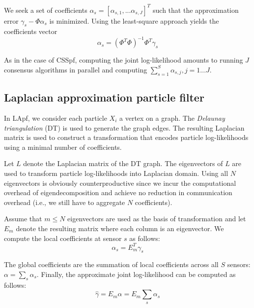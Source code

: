 \documentclass[10pt,letterpaper,final]{article}
\begin{document}
We seek a set of coefficients $\alpha_s = [\alpha_{s,1},...\alpha_{s,J}]^T$ such that the approximation error $\gamma_s - \Phi \alpha_s$ is minimized. Using the least-square approach yields the coefficients vector
\begin{equation}
\alpha_s = (\Phi^T\Phi)^{-1}\Phi^T\gamma_s
\end{equation}

As in the case of CSSpf, computing the joint log-likelihood amounts to running $J$ consensus algorithms in parallel and computing $\sum_{s=1}^S \alpha_{s,j}, j=1...J$.


\subsection{Laplacian approximation particle filter}
In LApf, we consider each particle $X_i$ a vertex on a graph. The \textit{Delaunay triangulation} (DT) is used to generate the graph edges. The resulting Laplacian matrix is used to construct a transformation that encodes particle log-likelihoods using a minimal number of coefficients. 

Let $L$ denote the Laplacian matrix of the DT graph. The eigenvectors of $L$ are used to transform particle log-likelihoods into Laplacian domain. Using all $N$ eigenvectors is obviously counterproductive since we incur the computational overhead of eigendecomposition and achieve no reduction in communication overhead (i.e., we still have to aggregate $N$ coefficients). 

Assume that $m\leq N$ eigenvectors are used as the basis of transformation and let $E_m$ denote the resulting matrix where each column is an eigenvector. We compute the local coefficients at sensor $s$ as follows:
\begin{equation}
\alpha_s = E_m^T\gamma_s
\end{equation}

The global coefficients are the summation of local coefficients across all $S$ sensors: $\alpha = \sum_s \alpha_s$. Finally, the approximate joint log-likelihood can be computed as follows:
\begin{equation}
\hat{\gamma} = E_m\alpha = E_m \sum_s \alpha_s
\end{equation}
\end{document}

